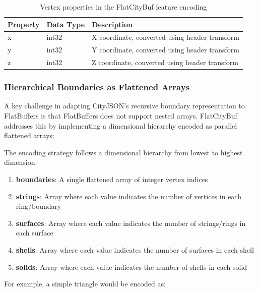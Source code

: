 \begin{itemize}
    \begin{table}[h]
      \centering
      \caption{Vertex properties in the FlatCityBuf feature encoding}
      \label{tab:vertex_properties}
      \small
      \begin{tabularx}{\textwidth}{@{}llX@{}}
        \toprule
        \textbf{Property} & \textbf{Data Type} & \textbf{Description} \\
        \midrule
        x & int32 & X coordinate, converted using header transform \\
        y & int32 & Y coordinate, converted using header transform \\
        z & int32 & Z coordinate, converted using header transform \\
        \bottomrule
      \end{tabularx}
    \end{table}
\end{itemize}

\subsubsection{Hierarchical Boundaries as Flattened Arrays}
\label{methodology:feature_encoding:geometry_encoding:flattened_arrays}

A key challenge in adapting CityJSON's recursive boundary representation to FlatBuffers is that FlatBuffers does not support nested arrays. FlatCityBuf addresses this by implementing a dimensional hierarchy encoded as parallel flattened arrays:

The encoding strategy follows a dimensional hierarchy from lowest to highest dimension:

\begin{enumerate}
  \item \textbf{boundaries}: A single flattened array of integer vertex indices
  \item \textbf{strings}: Array where each value indicates the number of vertices in each ring/boundary
  \item \textbf{surfaces}: Array where each value indicates the number of strings/rings in each surface
  \item \textbf{shells}: Array where each value indicates the number of surfaces in each shell
  \item \textbf{solids}: Array where each value indicates the number of shells in each solid
\end{enumerate}

For example, a simple triangle would be encoded as:

